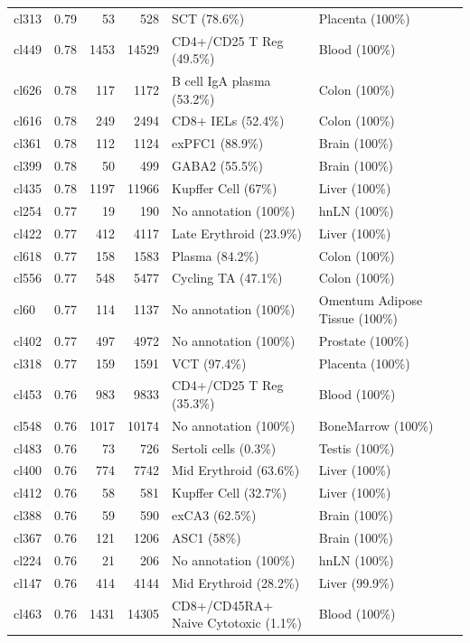 \begin{table}[ht!]
\begin{tabular}{lrrrll}
  cl313 & 0.79 &  53 & 528 & SCT (78.6\%) & Placenta (100\%) \\ 
  cl449 & 0.78 & 1453 & 14529 & CD4+/CD25 T Reg (49.5\%) & Blood (100\%) \\ 
  cl626 & 0.78 & 117 & 1172 & B cell IgA plasma (53.2\%) & Colon (100\%) \\ 
  cl616 & 0.78 & 249 & 2494 & CD8+ IELs (52.4\%) & Colon (100\%) \\ 
  cl361 & 0.78 & 112 & 1124 & exPFC1 (88.9\%) & Brain (100\%) \\ 
  cl399 & 0.78 &  50 & 499 & GABA2 (55.5\%) & Brain (100\%) \\ 
  cl435 & 0.78 & 1197 & 11966 & Kupffer Cell (67\%) & Liver (100\%) \\ 
  cl254 & 0.77 &  19 & 190 & No annotation (100\%) & hnLN (100\%) \\ 
  cl422 & 0.77 & 412 & 4117 & Late Erythroid (23.9\%) & Liver (100\%) \\ 
  cl618 & 0.77 & 158 & 1583 & Plasma (84.2\%) & Colon (100\%) \\ 
  cl556 & 0.77 & 548 & 5477 & Cycling TA (47.1\%) & Colon (100\%) \\ 
  cl60 & 0.77 & 114 & 1137 & No annotation (100\%) & Omentum Adipose Tissue (100\%) \\ 
  cl402 & 0.77 & 497 & 4972 & No annotation (100\%) & Prostate (100\%) \\ 
  cl318 & 0.77 & 159 & 1591 & VCT (97.4\%) & Placenta (100\%) \\ 
  cl453 & 0.76 & 983 & 9833 & CD4+/CD25 T Reg (35.3\%) & Blood (100\%) \\ 
  cl548 & 0.76 & 1017 & 10174 & No annotation (100\%) & BoneMarrow (100\%) \\ 
  cl483 & 0.76 &  73 & 726 & Sertoli cells (0.3\%) & Testis (100\%) \\ 
  cl400 & 0.76 & 774 & 7742 & Mid Erythroid (63.6\%) & Liver (100\%) \\ 
  cl412 & 0.76 &  58 & 581 & Kupffer Cell (32.7\%) & Liver (100\%) \\ 
  cl388 & 0.76 &  59 & 590 & exCA3 (62.5\%) & Brain (100\%) \\ 
  cl367 & 0.76 & 121 & 1206 & ASC1 (58\%) & Brain (100\%) \\ 
  cl224 & 0.76 &  21 & 206 & No annotation (100\%) & hnLN (100\%) \\ 
  cl147 & 0.76 & 414 & 4144 & Mid Erythroid (28.2\%) & Liver (99.9\%) \\ 
  cl463 & 0.76 & 1431 & 14305 & \specialcell[t]{CD8+/CD45RA+\\Naive Cytotoxic (1.1\%)} & Blood (100\%) \\ 

\end{tabular}
\end{table}
